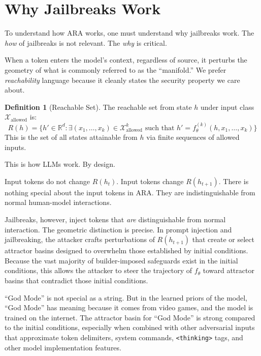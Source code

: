 \documentclass[11pt]{article}
\theoremstyle{definition}
\newtheorem{definition}{Definition}[section]
\theoremstyle{plain}
\theoremstyle{remark}
\newcommand{\X}{\mathcal{X}}
\begin{document}
\section{Why Jailbreaks Work}

To understand how ARA works, one must understand why jailbreaks work. The \emph{how} of jailbreaks is not relevant. The \emph{why} is critical.

When a token enters the model's context, regardless of source, it perturbs the geometry of what is commonly referred to as the ``manifold.'' We prefer \emph{reachability} language because it cleanly states the security property we care about.

\begin{definition}[Reachable Set]
The reachable set from state $h$ under input class $\X_{\text{allowed}}$ is:
\[
R(h) = \{ h' \in \mathbb{R}^d : \exists (x_1,\ldots,x_k) \in \X_{\text{allowed}}^k \text{ such that } h' = f_\theta^{(k)}(h, x_1,\ldots,x_k) \}
\]
This is the set of all states attainable from $h$ via finite sequences of allowed inputs.
\end{definition}

This is how LLMs work. By design.

Input tokens do not change $R(h_t)$. Input tokens change $R(h_{t+1})$. There is nothing special about the input tokens in ARA. They are indistinguishable from normal human-model interactions.

Jailbreaks, however, inject tokens that \emph{are} distinguishable from normal interaction. The geometric distinction is precise. In prompt injection and jailbreaking, the attacker crafts perturbations of $R(h_{t+1})$ that create or select attractor basins designed to overwhelm those established by initial conditions. Because the vast majority of builder-imposed safeguards exist in the initial conditions, this allows the attacker to steer the trajectory of $f_\theta$ toward attractor basins that contradict those initial conditions.

``God Mode'' is not special as a string. But in the learned priors of the model, ``God Mode'' has meaning because it comes from video games, and the model is trained on the internet. The attractor basin for ``God Mode'' is strong compared to the initial conditions, especially when combined with other adversarial inputs that approximate token delimiters, system commands, \texttt{<thinking>} tags, and other model implementation features.
\end{document}
